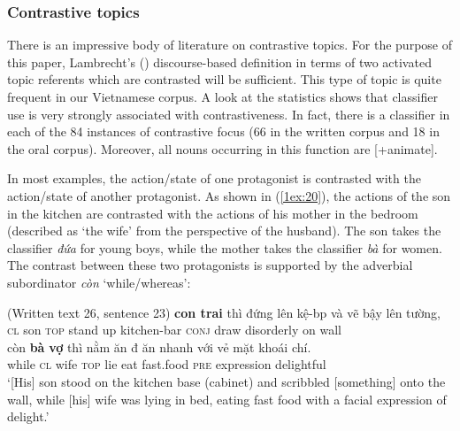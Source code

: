 \documentclass[output=paper]{langsci/langscibook}
\begin{document}
\subsubsection{Contrastive topics}\label{1sec:342}

There is an impressive body of literature on contrastive topics. For the purpose of this paper, Lambrecht's (\citeyear[][183, 291, 195]{lambrecht:94}) discourse-based definition in terms of two activated topic referents which are contrasted will be sufficient. This type of topic is quite frequent in our Vietnamese corpus. A look at the statistics shows that classifier use is very strongly associated with contrastiveness. In fact, there is a classifier in each of the 84 instances of contrastive focus (66 in the written corpus and 18 in the oral corpus). Moreover, all nouns occurring in this function are [+animate].

In most examples, the action/state of one protagonist is contrasted with the action/state of another protagonist. As shown in (\ref{1ex:20}), the actions of the son in the kitchen are contrasted with the actions of his mother in the bedroom (described as `the wife' from the perspective of the husband). The son takes the classifier {\emph{đứa}} for young boys, while the mother takes the classifier {\emph{bà}} for women. The contrast between these two protagonists is supported by the adverbial subordinator {\emph{còn }} `while/whereas':

\largerpage[2]
\begin{exe}
\ex\label{1ex:20}
(Written text 26, sentence 23)
\exi{}
 {\textbf{con trai}}  thì     đứng lên  kệ-b{\dae}p           và        vẽ     bậy           lên  tường, \\
{\textsc{cl}}   son         {\textsc{top}}  stand up  kitchen-bar  {\textsc{conj}} draw disorderly on   wall \\
\glt 
\exi{}
\gll còn     {\textbf{bà}}  {\textbf{vợ}}      thì     nằm  ăn  {đ{\daob} ăn nhanh}  với    {vẻ mặt}         {khoái chí}. \\
while  {\textsc{cl}} wife  {\textsc{top}}  lie    eat  fast.food        {\textsc{pre}}  expression  delightful \\
\glt `[His] son stood on the kitchen base (cabinet) and scribbled [something] onto the wall, while [his] wife was lying in bed, eating fast food with a facial expression of delight.'
\end{exe}
\end{document}
